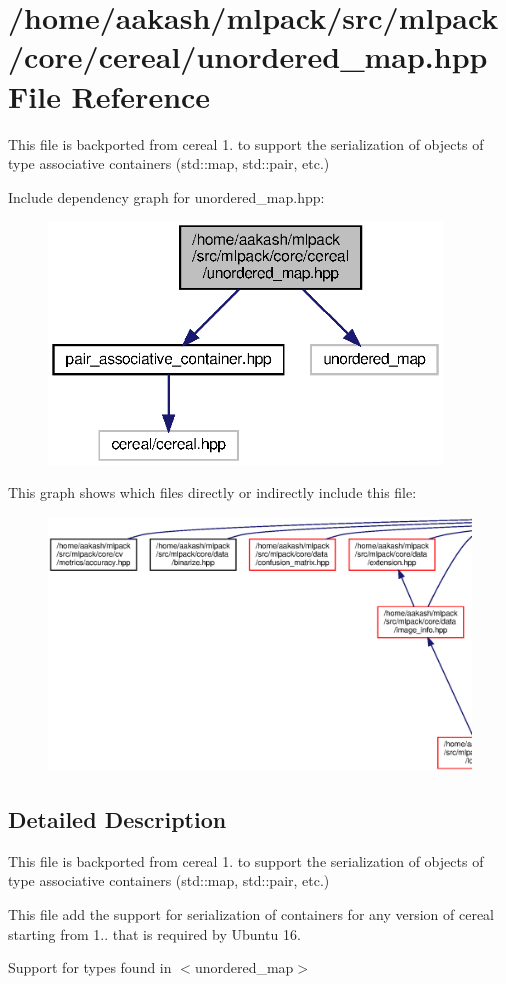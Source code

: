 \section{/home/aakash/mlpack/src/mlpack/core/cereal/unordered\+\_\+map.hpp File Reference}
\label{unordered__map_8hpp}


This file is backported from cereal 1. to support the serialization of objects of type associative containers (std\+::map, std\+::pair, etc.)  


Include dependency graph for unordered\+\_\+map.\+hpp\+:
\nopagebreak
\begin{figure}[H]
\begin{center}
\leavevmode
\includegraphics[width=296pt]{unordered__map_8hpp__incl}
\end{center}
\end{figure}
This graph shows which files directly or indirectly include this file\+:
\nopagebreak
\begin{figure}[H]
\begin{center}
\leavevmode
\includegraphics[width=350pt]{unordered__map_8hpp__dep__incl}
\end{center}
\end{figure}


\subsection{Detailed Description}
This file is backported from cereal 1. to support the serialization of objects of type associative containers (std\+::map, std\+::pair, etc.) 

This file add the support for serialization of containers for any version of cereal starting from 1.. that is required by Ubuntu 16.

Support for types found in $<$unordered\+\_\+map$>$ 